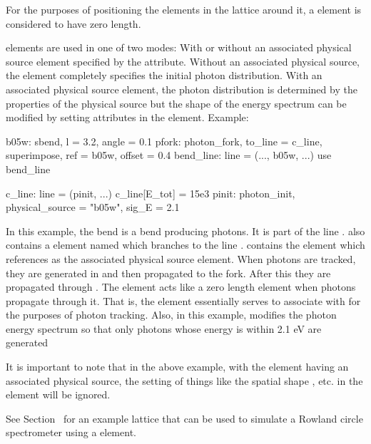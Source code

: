 {\begin{description}
  \end{description}

For the purposes of positioning the elements in the lattice around it,
a  element is considered to have zero length.

 elements are used in one of two modes: With or without an associated physical
source element specified by the  attribute. Without an associated physical
source, the  element completely specifies the initial photon distribution. With an
associated physical source element, the photon distribution is determined by the properties of the
physical source but the shape of the energy spectrum can be modified by setting attributes in the
 element. Example:
\begin{example}
  b05w: sbend, l = 3.2, angle = 0.1
  pfork: photon_fork, to_line = c_line, superimpose, ref = b05w, offset = 0.4
  bend_line: line = (..., b05w, ...)
  use bend_line

  c_line: line = (pinit, ...)
  c_line[E_tot] = 15e3
  pinit: photon_init, physical_source = "b05w", sig_E = 2.1
\end{example}
In this example, the bend  is a bend producing photons. It is part of the line
.  also contains a  element named  which
branches to the line .  contains the  element  which
references  as the associated physical source element. When photons are tracked, they are
generated in  and then propagated to the  fork.  After this they are propagated
through . The  element acts like a zero length  element when photons
propagate through it. That is, the  element essentially serves to associate 
with  for the purposes of photon tracking. Also, in this example,  modifies the
photon energy spectrum so that only photons whose energy is within 2.1 eV are generated

It is important to note that in the above example, with the  element having an
associated physical source, the setting of things like the spatial shape , etc. in the
 element will be ignored.

See Section~ for an example lattice that can be used to simulate a Rowland circle
spectrometer using a  element.

}
